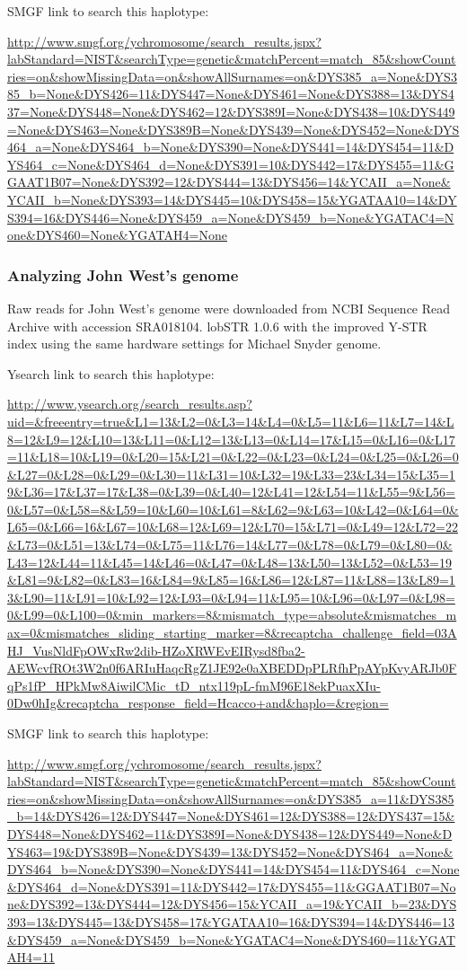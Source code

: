 SMGF link to search this haplotype:

\url{http://www.smgf.org/ychromosome/search_results.jspx?labStandard=NIST&searchType=genetic&matchPercent=match_85&showCountries=on&showMissingData=on&showAllSurnames=on&DYS385_a=None&DYS385_b=None&DYS426=11&DYS447=None&DYS461=None&DYS388=13&DYS437=None&DYS448=None&DYS462=12&DYS389I=None&DYS438=10&DYS449=None&DYS463=None&DYS389B=None&DYS439=None&DYS452=None&DYS464_a=None&DYS464_b=None&DYS390=None&DYS441=14&DYS454=11&DYS464_c=None&DYS464_d=None&DYS391=10&DYS442=17&DYS455=11&GGAAT1B07=None&DYS392=12&DYS444=13&DYS456=14&YCAII_a=None&YCAII_b=None&DYS393=14&DYS445=10&DYS458=15&YGATAA10=14&DYS394=16&DYS446=None&DYS459_a=None&DYS459_b=None&YGATAC4=None&DYS460=None&YGATAH4=None}

\subsubsection{Analyzing John West's genome}

Raw reads for John West's genome were downloaded from NCBI Sequence Read Archive with accession SRA018104. lobSTR 1.0.6 with the improved Y-STR index using the same hardware settings for Michael Snyder genome. 

Ysearch link to search this haplotype:

\url{http://www.ysearch.org/search_results.asp?uid=&freeentry=true&L1=13&L2=0&L3=14&L4=0&L5=11&L6=11&L7=14&L8=12&L9=12&L10=13&L11=0&L12=13&L13=0&L14=17&L15=0&L16=0&L17=11&L18=10&L19=0&L20=15&L21=0&L22=0&L23=0&L24=0&L25=0&L26=0&L27=0&L28=0&L29=0&L30=11&L31=10&L32=19&L33=23&L34=15&L35=19&L36=17&L37=17&L38=0&L39=0&L40=12&L41=12&L54=11&L55=9&L56=0&L57=0&L58=8&L59=10&L60=10&L61=8&L62=9&L63=10&L42=0&L64=0&L65=0&L66=16&L67=10&L68=12&L69=12&L70=15&L71=0&L49=12&L72=22&L73=0&L51=13&L74=0&L75=11&L76=14&L77=0&L78=0&L79=0&L80=0&L43=12&L44=11&L45=14&L46=0&L47=0&L48=13&L50=13&L52=0&L53=19&L81=9&L82=0&L83=16&L84=9&L85=16&L86=12&L87=11&L88=13&L89=13&L90=11&L91=10&L92=12&L93=0&L94=11&L95=10&L96=0&L97=0&L98=0&L99=0&L100=0&min_markers=8&mismatch_type=absolute&mismatches_max=0&mismatches_sliding_starting_marker=8&recaptcha_challenge_field=03AHJ_VusNldFpOWxRw2dib-HZoXRWEvEIRysd8fba2-AEWcvfROt3W2n0f6ARIuHaqcRgZ1JE92e0aXBEDDpPLRfhPpAYpKvyARJb0FqPs1fP_HPkMw8AiwilCMic_tD_ntx119pL-fmM96E18ekPuaxXIu-0Dw0hIg&recaptcha_response_field=Hcacco+and&haplo=&region=}

SMGF link to search this haplotype:

\url{http://www.smgf.org/ychromosome/search_results.jspx?labStandard=NIST&searchType=genetic&matchPercent=match_85&showCountries=on&showMissingData=on&showAllSurnames=on&DYS385_a=11&DYS385_b=14&DYS426=12&DYS447=None&DYS461=12&DYS388=12&DYS437=15&DYS448=None&DYS462=11&DYS389I=None&DYS438=12&DYS449=None&DYS463=19&DYS389B=None&DYS439=13&DYS452=None&DYS464_a=None&DYS464_b=None&DYS390=None&DYS441=14&DYS454=11&DYS464_c=None&DYS464_d=None&DYS391=11&DYS442=17&DYS455=11&GGAAT1B07=None&DYS392=13&DYS444=12&DYS456=15&YCAII_a=19&YCAII_b=23&DYS393=13&DYS445=13&DYS458=17&YGATAA10=16&DYS394=14&DYS446=13&DYS459_a=None&DYS459_b=None&YGATAC4=None&DYS460=11&YGATAH4=11} 

